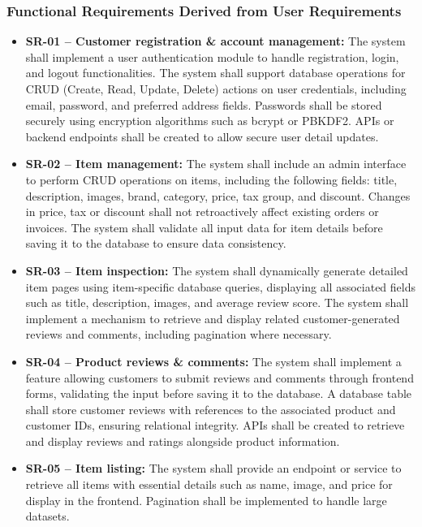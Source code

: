 \documentclass[twoside,a4paper,journal]{IEEEtran}
\begin{document}
\subsubsection{Functional Requirements Derived from User Requirements}
\begin{itemize}
  \item \textbf{SR-01 -- Customer registration \& account management:}
  The system shall implement a user authentication module to
  handle registration, login, and logout functionalities. The system shall
  support database operations for CRUD (Create, Read, Update, Delete) actions on
  user credentials, including email, password, and preferred address fields. Passwords
  shall be stored securely using encryption algorithms such as bcrypt or PBKDF2. APIs
  or backend endpoints shall be created to allow secure user detail updates.
  \item \textbf{SR-02 -- Item management:}
  The system shall include
  an admin interface to perform CRUD operations on items, including the following
  fields: title, description, images, brand, category, price, tax group, and
  discount. Changes in price, tax or discount shall not retroactively affect
  existing orders or invoices. The system shall validate all input data for item
  details before saving it to the database to ensure data consistency.
  \item \textbf{SR-03 -- Item inspection:}
  The system shall
  dynamically generate detailed item pages using item-specific database queries,
  displaying all associated fields such as title, description, images, and
  average review score. The system shall implement a mechanism to retrieve and
  display related customer-generated reviews and comments, including pagination
  where necessary.
  \item \textbf{SR-04 -- Product reviews \& comments:} The
  system shall implement a feature allowing customers to submit reviews and
  comments through frontend forms, validating the input before saving it to the
  database. A database table shall store customer reviews with references to the
  associated product and customer IDs, ensuring relational integrity. APIs shall
  be created to retrieve and display reviews and ratings alongside product
  information.
  \item \textbf{SR-05 -- Item listing:} The system shall provide an
  endpoint or service to retrieve all items with essential details such as name,
  image, and price for display in the frontend. Pagination shall be implemented
  to handle large datasets.

\end{itemize}
\end{document}
